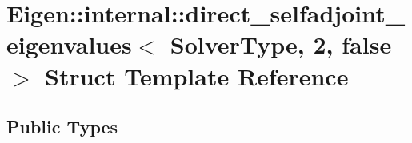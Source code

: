 \hypertarget{struct_eigen_1_1internal_1_1direct__selfadjoint__eigenvalues_3_01_solver_type_00_012_00_01false_01_4}{}\section{Eigen\+:\+:internal\+:\+:direct\+\_\+selfadjoint\+\_\+eigenvalues$<$ Solver\+Type, 2, false $>$ Struct Template Reference}
\label{struct_eigen_1_1internal_1_1direct__selfadjoint__eigenvalues_3_01_solver_type_00_012_00_01false_01_4}
\subsection*{Public Types}
